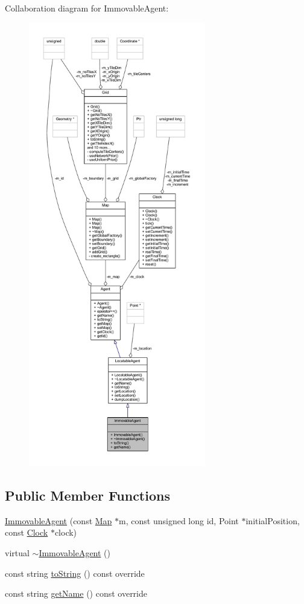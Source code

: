 Collaboration diagram for Immovable\+Agent\+:\nopagebreak
\begin{figure}[H]
\begin{center}
\leavevmode
\includegraphics[height=550pt]{class_immovable_agent__coll__graph}
\end{center}
\end{figure}
\subsection*{Public Member Functions}
\begin{DoxyCompactItemize}
\item 
\hyperlink{class_immovable_agent_a0b4253828510a7212b77c5921a057900}{Immovable\+Agent} (const \hyperlink{class_map}{Map} $\ast$m, const unsigned long id, Point $\ast$initial\+Position, const \hyperlink{class_clock}{Clock} $\ast$clock)
\item 
virtual \hyperlink{class_immovable_agent_aa2dfb26891059da00ff897a7c6e6a47c}{$\sim$\+Immovable\+Agent} ()
\item 
const string \hyperlink{class_immovable_agent_a805b0d18035550d902d617a8c7ccc062}{to\+String} () const override
\item 
const string \hyperlink{class_immovable_agent_ae8fbccc744f6f806e47dfd242fa67a1c}{get\+Name} () const override
\end{DoxyCompactItemize}


